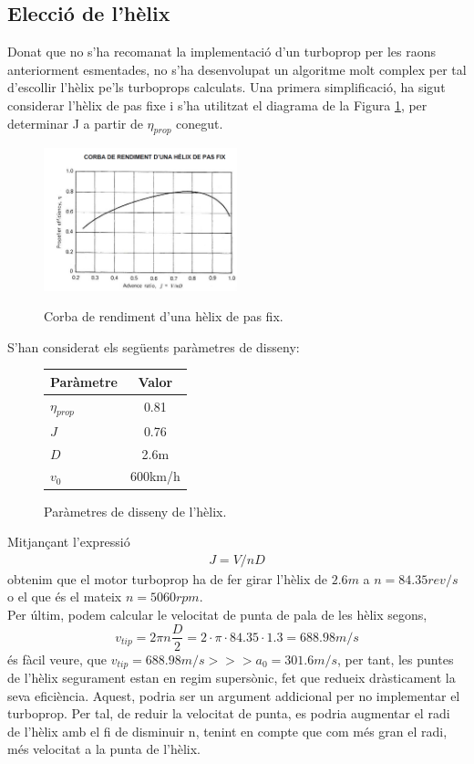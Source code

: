 \subsection{Elecció de l'hèlix}
Donat que no s'ha recomanat la implementació d'un turboprop per les raons anteriorment esmentades, no s'ha desenvolupat un algoritme molt complex per tal d'escollir l'hèlix pe'ls turboprops calculats. Una primera simplificació, ha sigut considerar l'hèlix de pas fixe i s'ha utilitzat el diagrama de la Figura \ref{diag_helix}, per determinar J a partir de $\eta_{prop}$ conegut.

\begin{figure}[H]
	\centering
	\includegraphics[width = 0.5\textwidth]{./pics/diag_helix}
	\label{diag_helix}
	\caption{Corba de rendiment d'una hèlix de pas fix.}
\end{figure}

\noindent S'han considerat els següents paràmetres de disseny:
\begin{figure}[H]
	\centering
	\begin{tabular}{lc}
		\toprule[3pt]
		\textbf{Paràmetre}&\textbf{Valor}\\
		\midrule[1pt]
		$\eta_{prop}$ & 0.81\\
		$J$ & 0.76\\
		$D$ & 2.6m\\
		$v_0$&600km/h\\
				
		\bottomrule[2pt]
	\end{tabular}
	\label{helix_param}
	\caption{Paràmetres de disseny de l'hèlix.}
\end{figure}
Mitjançant l'expressió 
\begin{align}
	J = V/nD
\end{align}
obtenim que el motor turboprop ha de fer girar l'hèlix de $2.6m$ a \textbf{$n=84.35 rev/s$} o el que és el mateix \textbf{$n=5060rpm$}.\\

\noindent Per últim, podem calcular le velocitat de punta de pala de les hèlix segons,
\begin{equation}
	v_{tip}=2\pi n\frac{D}{2} = 2\cdot\pi\cdot84.35\cdot 1.3=688.98m/s
\end{equation}
és fàcil veure, que $v_{tip}=688.98m/s >>> a_0 =  301.6m/s$, per tant, les puntes de l'hèlix segurament estan en regim supersònic, fet que redueix dràsticament la seva eficiència. Aquest, podria ser un argument addicional per no implementar el turboprop. Per tal, de reduir la velocitat de punta, es podria augmentar el radi de l'hèlix amb el fi de disminuir n, tenint en compte que com més gran el radi, més velocitat a la punta de l'hèlix.

